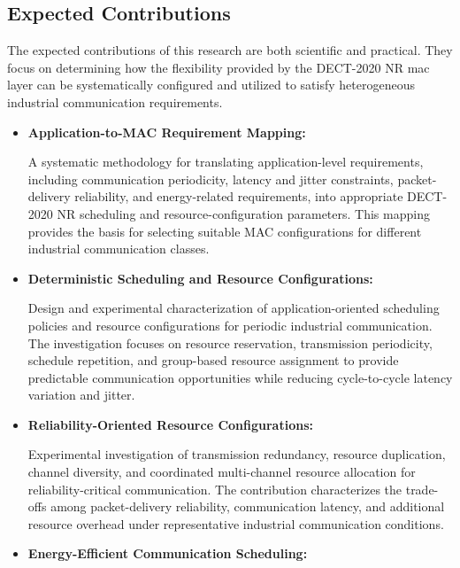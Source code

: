 \documentclass[12pt,a4paper]{article}
\begin{document}
\subsection{Expected Contributions}
\label{subsec:expected_contributions}

The expected contributions of this research are both scientific and practical.
They focus on determining how the flexibility provided by the DECT-2020 NR
\gls{mac} layer can be systematically configured and utilized to satisfy
heterogeneous industrial communication requirements.

\begin{itemize}

\item \textbf{Application-to-MAC Requirement Mapping:}

A systematic methodology for translating application-level requirements,
including communication periodicity, latency and jitter constraints,
packet-delivery reliability, and energy-related requirements, into appropriate
DECT-2020 NR scheduling and resource-configuration parameters. This mapping
provides the basis for selecting suitable MAC configurations for different
industrial communication classes.

\item \textbf{Deterministic Scheduling and Resource Configurations:}

Design and experimental characterization of application-oriented scheduling
policies and resource configurations for periodic industrial communication.
The investigation focuses on resource reservation, transmission periodicity,
schedule repetition, and group-based resource assignment to provide predictable
communication opportunities while reducing cycle-to-cycle latency variation
and jitter.

\item \textbf{Reliability-Oriented Resource Configurations:}

Experimental investigation of transmission redundancy, resource duplication,
channel diversity, and coordinated multi-channel resource allocation for
reliability-critical communication. The contribution characterizes the
trade-offs among packet-delivery reliability, communication latency, and
additional resource overhead under representative industrial communication
conditions.

\item \textbf{Energy-Efficient Communication Scheduling:}


\end{itemize}
\end{document}
